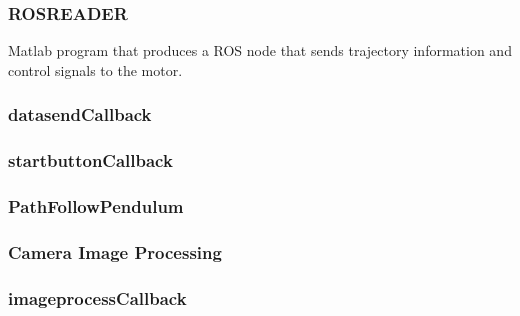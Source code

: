\documentclass{article}
\let\Oldsubsubsection\subsubsection
\renewcommand{\subsubsection}{\FloatBarrier\Oldsubsubsection}
\begin{document}
\subsubsection{ROS\textunderscore READER}
Matlab program that produces a ROS node that sends trajectory information and control signals to the motor.

\clearpage
\subsubsection{datasend\textunderscore Callback}

\clearpage
\subsubsection{startbutton\textunderscore Callback}

\clearpage
\subsubsection{PathFollowPendulum}

\clearpage
\subsubsection{Camera Image Processing}

\clearpage
\subsubsection{imageprocess\textunderscore Callback}

\clearpage
\end{document}
